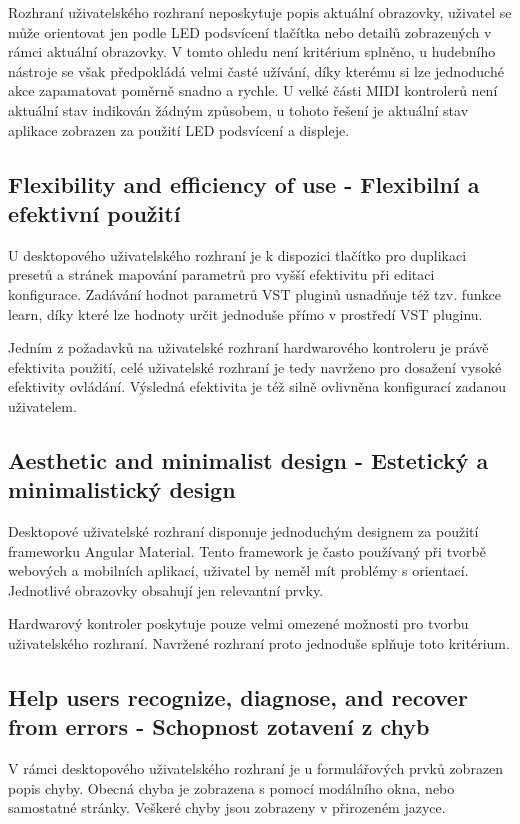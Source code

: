 \documentclass[thesis=M,czech]{FITthesis}[2019/03/06]
\begin{document}
			Rozhraní uživatelského rozhraní neposkytuje popis aktuální obrazovky, uživatel se může orientovat jen podle LED podsvícení tlačítka nebo detailů zobrazených v rámci aktuální obrazovky. V tomto ohledu není kritérium splněno, u hudebního nástroje se však předpokládá velmi časté užívání, díky kterému si lze jednoduché akce zapamatovat poměrně snadno a rychle. U velké části MIDI kontrolerů není aktuální stav indikován žádným způsobem, u tohoto řešení je aktuální stav aplikace zobrazen za použití LED podsvícení a displeje.
			
		\subsection{Flexibility and efficiency of use - Flexibilní a efektivní použití}
			U desktopového uživatelského rozhraní je k dispozici tlačítko pro duplikaci presetů a stránek mapování parametrů pro vyšší efektivitu při editaci konfigurace. Zadávání hodnot parametrů VST pluginů usnadňuje též tzv. funkce learn, díky které lze hodnoty určit jednoduše přímo v prostředí VST pluginu.
			
			Jedním z požadavků na uživatelské rozhraní hardwarového kontroleru je právě efektivita použití, celé uživatelské rozhraní je tedy navrženo pro dosažení vysoké efektivity ovládání. Výsledná efektivita je též silně ovlivněna konfigurací zadanou uživatelem.
		
		\subsection{Aesthetic and minimalist design - Estetický a minimalistický design}
			Desktopové uživatelské rozhraní disponuje jednoduchým designem za použití frameworku Angular Material. Tento framework je často používaný při tvorbě webových a mobilních aplikací, uživatel by neměl mít problémy s orientací. Jednotlivé obrazovky obsahují jen relevantní prvky.
			
			Hardwarový kontroler poskytuje pouze velmi omezené možnosti pro tvorbu uživatelského rozhraní. Navržené rozhraní proto jednoduše splňuje toto kritérium. 
		
		\subsection{Help users recognize, diagnose, and recover from errors - Schopnost zotavení z chyb}
			V rámci desktopového uživatelského rozhraní je u formulářových prvků zobrazen popis chyby. Obecná chyba je zobrazena s pomocí modálního okna, nebo samostatné stránky. Veškeré chyby jsou zobrazeny v přirozeném jazyce.
			
\end{document}
